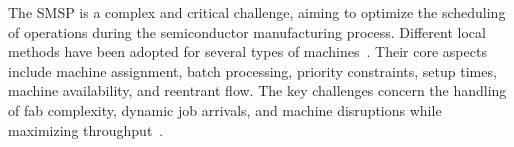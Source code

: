 The SMSP is a complex and critical challenge, aiming to optimize the scheduling of operations during the semiconductor manufacturing process. Different local methods have been adopted for several types of machines~\cite{chan2024situation}. Their core aspects include machine assignment, batch processing, priority constraints, setup times, machine availability, and reentrant flow. The key challenges concern the handling of fab complexity, dynamic job arrivals, and machine disruptions while maximizing throughput~\cite{el2023}. %





